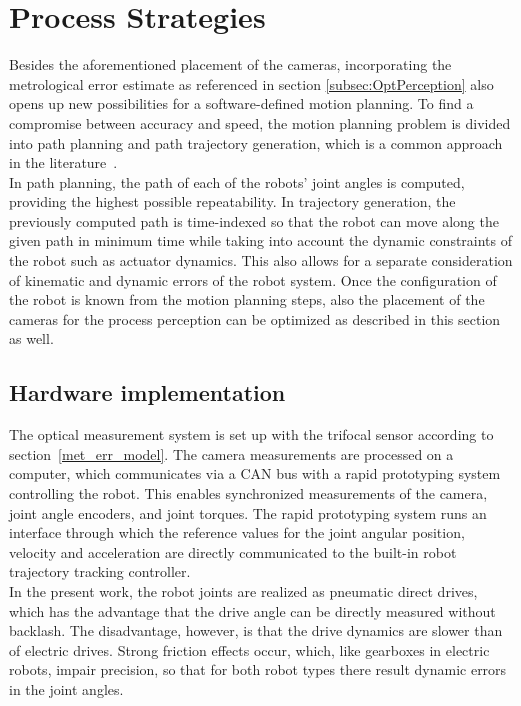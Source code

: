 \documentclass[5p,times,procedia]{elsarticle}
\begin{document}
\section{Process Strategies}
Besides the aforementioned placement of the cameras, incorporating the metrological error estimate as referenced in section \ref{subsec:OptPerception} also opens up new possibilities for a software-defined motion planning.
To find a compromise between accuracy and speed, the motion planning problem is divided into path planning and path trajectory generation, which is a common approach in the literature~\cite{Choset05}.\\
In path planning, the path of each of the robots' joint angles is computed, providing the highest possible repeatability.
In trajectory generation, the previously computed path is time-indexed so that the robot can move along the given path in minimum time while taking into account the dynamic constraints of the robot such as actuator dynamics.
This also allows for a separate consideration of kinematic and dynamic errors of the robot system. 
Once the configuration of the robot is known from the motion planning steps, also the placement of the cameras for the process perception can be optimized as described in this section as well. 
%
\subsection{Hardware implementation}
The optical measurement system is set up with the trifocal sensor according to section~\ref{met_err_model}.
The camera measurements are processed on a computer, which communicates via a CAN bus with a rapid prototyping system controlling the robot.
This enables synchronized measurements of the camera, joint angle encoders, and joint torques.
The rapid prototyping system runs an interface through which the reference values for the joint angular position, velocity and acceleration are directly communicated to the built-in robot trajectory tracking controller.\\
In the present work, the robot joints are realized as pneumatic direct drives, which has the advantage that the drive angle can be directly measured without backlash. 
The disadvantage, however, is that the drive dynamics are slower than of electric drives. Strong friction effects occur, which, like gearboxes in electric robots, impair precision, so that for both robot types there result dynamic errors in the joint angles. 
%
\end{document}

